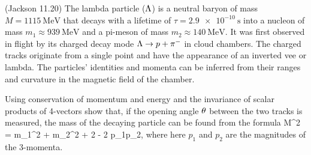 \newcommand{\mq}{m_1}
\newcommand{\mw}{m_2}
\newcommand{\pq}{p_1}
\newcommand{\pw}{p_2}

\newcommand{\mLam}{\SI{1115}{\MeV}}
\newcommand{\tauLam}{\SI{2.9e-10}{\second}}
\newcommand{\mnuc}{\SI{939}{\MeV}}
\newcommand{\mpi}{\SI{140}{\MeV}}

\begin{statement}{(Jackson 11.20)}
	The lambda particle ($\Lambda$) is a neutral baryon of mass $M = \mLam$ that decays with a lifetime of $\tau = \tauLam$ into a nucleon of mass $\mq \approx \mnuc$ and a pi-meson of mass $\mw \approx \mpi$.  It was first observed in flight by its charged decay mode $\Lambda \to p + \pi^-$ in cloud chambers.  The charged tracks originate from a single point and have the appearance of an inverted vee or lambda.  The particles' identities and momenta can be inferred from their ranges and curvature in the magnetic field of the chamber.
\end{statement}

\newcommand{\Pq}{P_1}
\newcommand{\Pw}{P_2}

\newcommand{\Pmu}{P^\mu}
\newcommand{\Psmu}{P_\mu}
\newcommand{\Pqmu}{{\Pq}^\mu}
\newcommand{\Pqsmu}{{\Pq}_\mu}
\newcommand{\Pwmu}{{\Pq}^\mu}
\newcommand{\Pwsmu}{{\Pq}_\mu}

\newcommand{\vp}{\vb{p}}
\newcommand{\vpq}{\vp_1}
\newcommand{\vpw}{\vp_2}

\begin{problem} \label{4.a}
	Using conservation of momentum and energy and the invariance of scalar products of 4-vectors show that, if the opening angle $\theta$ between the two tracks is measured, the mass of the decaying particle can be found from the formula
	\beq
		M^2 = \mq^2 + \mw^2 + 2 \Eq \Ew - 2 \pq \pw \cos\tht,
	\eeq
	where here $\pq$ and $\pw$ are the magnitudes of the 3-momenta.
\end{problem}

